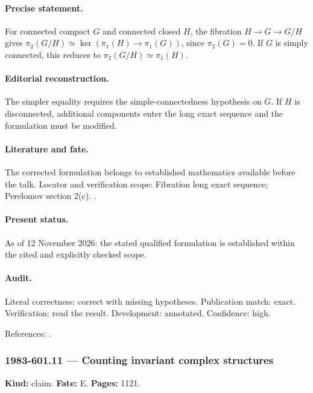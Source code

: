 \paragraph{Precise statement.} For connected compact \(G\) and connected closed \(H\), the fibration \(H\to G\to G/H\) gives \(\pi_2(G/H)\simeq\ker(\pi_1(H)\to\pi_1(G))\), since \(\pi_2(G)=0\). If \(G\) is simply connected, this reduces to \(\pi_2(G/H)\simeq\pi_1(H)\).

\paragraph{Editorial reconstruction.} The simpler equality requires the simple-connectedness hypothesis on \(G\). If \(H\) is disconnected, additional components enter the long exact sequence and the formulation must be modified.

\paragraph{Literature and fate.} The corrected formulation belongs to established mathematics available before the talk. Locator and verification scope: Fibration long exact sequence; Perelomov section 2(c). \cite{hatcher2002algebraic,perelomov1981instantons}.

\paragraph{Present status.} As of 12 November 2026: the stated qualified formulation is established within the cited and explicitly checked scope.

\paragraph{Audit.} Literal correctness: correct with missing hypotheses. Publication match: exact. Verification: read the result. Development: annotated. Confidence: high.

\noindent References: \citep{hatcher2002algebraic,perelomov1981instantons}.\par

\subsubsection{1983-601.11 --- Counting invariant complex structures}

\label{item:1983-601.11}

\noindent\textbf{Kind:} claim. \textbf{Fate:} E. \textbf{Pages:} 1121.\par

